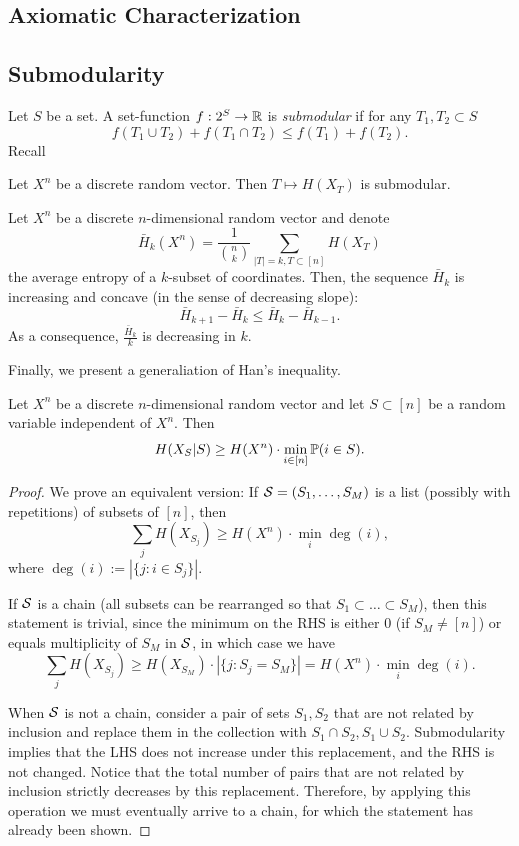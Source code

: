 \subsection{Axiomatic Characterization}

\subsection{Submodularity}

\begin{example}[projection]
    
\end{example}

Let $S$ be a set. A set-function $f:2^S\to\mathbb{R}$ is \textit{submodular} if for any $T_1,T_2\subset S$
\[f(T_1\cup T_2)+f(T_1\cap T_2)\leq f(T_1)+f(T_2).\]
Recall
\begin{theorem}[Submodularity]
    Let $X^n$ be a discrete random vector. Then $T\mapsto H(X_T)$ is submodular.
\end{theorem}
\begin{theorem}
    Let $X^n$ be a discrete $n$-dimensional random vector and denote $$\bar{H}_k(X^n)=\frac{1}{\binom{n}{k}}\sum_{|T|=k,T\subset[n]}H(X_T)$$
    the average entropy of a $k$-subset of coordinates. 
    Then, the sequence $\bar{H}_k$ is increasing and concave (in the sense of decreasing slope):
    \[\bar{H}_{k+1}-\bar{H}_k\leq\bar{H}_k-\bar{H}_{k-1}.\]
    As a consequence, $\frac{\bar{H}_k}{k}$ is decreasing in $k$.
\end{theorem}

Finally, we present a generaliation of Han's inequality.
\begin{theorem}
    Let $X^n$ be a discrete $n$-dimensional random vector and let $S\subset [n]$ be a random variable independent of $X^n$. Then 
    \[H(X_S|S)\geq H(X^n)\cdot\min_{i\in [n]}\mathbb{P}(i\in S).\]
\end{theorem}
\begin{proof}
    We prove an equivalent version: If $\mathcal{S}=(S_1,\dots,S_M)$ is a list (possibly with repetitions) of subsets of $[n]$, then
    \[\sum_{j}H(X_{S_j})\geq H(X^n)\cdot\min_i\deg(i),\]
    where $\deg(i):=|\{j:i\in S_j\}|$. 
    
    If $\mathcal{S}$ is a chain (all subsets can be rearranged so that $S_1\subset \dots\subset S_M$), then this statement is trivial,
    since the minimum on the RHS is either 0 (if $S_M\neq [n]$) or equals multiplicity of $S_M$ in $\mathcal{S}$, in which case we have 
    \[\sum_j H(X_{S_j})\geq H(X_{S_M})\cdot |\{j:S_j=S_M\}|=H(X^n)\cdot\min_i\deg(i).\]
    
    When $\mathcal{S}$ is not a chain, consider a pair of sets $S_1,S_2$ that are not related by inclusion and replace them in the collection with $S_1\cap S_2,S_1\cup S_2$.
    Submodularity implies that the LHS does not increase under this replacement, and the RHS is not changed.
    Notice that the total number of pairs that are not related by inclusion strictly decreases by this replacement.
    Therefore, by applying this operation we must eventually arrive to a chain, for which the statement has already been shown.
\end{proof}


